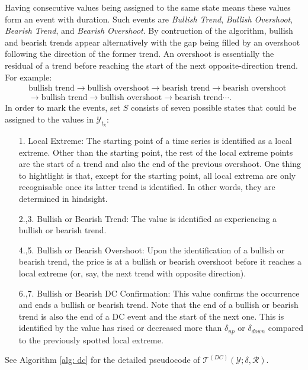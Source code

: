 Having consecutive values being assigned to the same state means these values form an event with duration. Such events are \textit{Bullish Trend}, \textit{Bullish Overshoot}, \textit{Bearish Trend}, and \textit{Bearish Overshoot}. By contruction of the algorithm, bullish and bearish trends appear alternatively with the gap being filled by an overshoot following the direction of the former trend. An overshoot is essentially the residual of a trend before reaching the start of the next opposite-direction trend. For example:
\begin{align*}
    &\text{bullish trend} \rightarrow \text{bullish overshoot} \rightarrow \text{bearish trend} \rightarrow \text{bearish overshoot} \\
    & \rightarrow \text{bullish trend} \rightarrow \text{bullish overshoot} \rightarrow \text{bearish trend} \cdots.
\end{align*}
In order to mark the events, set $S$ consists of seven possible states that could be assigned to the values in $\mathcal{Y}_{t_k}$:
\begin{enumerate}
    \item[1.] Local Extreme: The starting point of a time series is identified as a local extreme. Other than the starting point, the rest of the local extreme points are the start of a trend and also the end of the previous overshoot. One thing to hightlight is that, except for the starting point, all local extrema are only recognisable once its latter trend is identified. In other words, they are determined in hindsight.
    \item[2.,3.] Bullish or Bearish Trend: The value is identified as experiencing a bullish or bearish trend.
    \item[4.,5.] Bullish or Bearish Overshoot: Upon the identification of a bullish or bearish trend, the price is at a bullish or bearish overshoot before it reaches a local extreme (or, say, the next trend with opposite direction).
    \item[6.,7.] Bullish or Bearish DC Confirmation: This value confirms the occurrence and ends a bullish or bearish trend. Note that the end of a bullish or bearish trend is also the end of a DC event and the start of the next one. This is identified by the value has rised or decreased more than $\delta_{up}$ or $\delta_{down}$ compared to the previously spotted local extreme.
\end{enumerate}
See Algorithm \ref{alg: dc} for the detailed pseudocode of $\mathcal{T}^{(DC)} (\mathcal{Y}; \delta, \mathcal{R})$.

